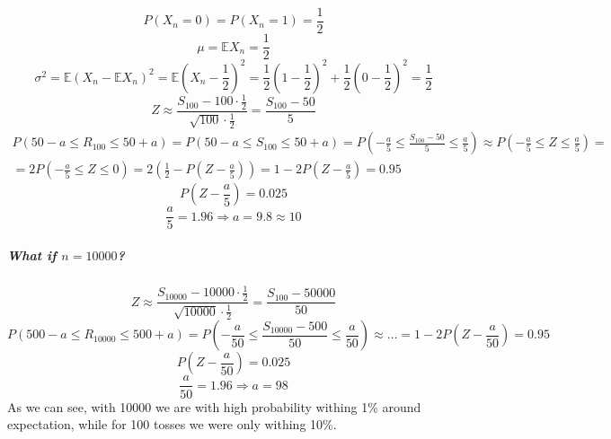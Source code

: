 $$P(X_n=0) = P(X_n=1) = \frac{1}{2}$$
$$\mu = \mathbb{E} X_n = \frac{1}{2}$$
$$\sigma^2 = \mathbb{E} \left( X_n - \mathbb{E} X_n \right)^2 = \mathbb{E} \left(X_n-\frac{1}{2}\right)^2 = \frac{1}{2}\left(1-\frac{1}{2} \right)^2  + \frac{1}{2}\left(0-\frac{1}{2} \right)^2 = \frac{1}{2}$$
$$Z \approx \frac{S_{100} - 100 \cdot \frac{1}{2}}{\sqrt{100} \cdot \frac{1}{2}} = \frac{S_{100} - 50}{5}$$
\begin{align*}
P(50-a\leq R_{100} \leq 50+a) = P(50-a\leq S_{100} \leq 50+a) = P\left(-\frac{a}{5}\leq \frac{S_{100}-50}{5} \leq \frac{a}{5}\right) \approx P\left(-\frac{a}{5}\leq Z \leq \frac{a}{5}\right) =\\= 2 P \left(-\frac{a}{5}\leq Z \leq 0\right) = 2 \left(\frac{1}{2} - P \left(Z -\frac{a}{5}\right)\right) = 1 - 2 P \left(Z -\frac{a}{5}\right) = 0.95
\end{align*}
$$P \left(Z -\frac{a}{5}\right) = 0.025$$
$$\frac{a}{5} = 1.96 \Rightarrow a = 9.8 \approx 10$$
\subparagraph{What if $n=10000$?}

$$Z \approx \frac{S_{10000} - 10000 \cdot \frac{1}{2}}{\sqrt{10000} \cdot \frac{1}{2}} = \frac{S_{100} - 50000}{50}$$
$$P(500-a\leq R_{10000} \leq 500+a) = P\left(-\frac{a}{50}\leq \frac{S_{10000}-500}{50} \leq \frac{a}{50} \right) \approx \dots = 1 - 2 P \left(Z -\frac{a}{50}\right) = 0.95$$
$$P \left(Z -\frac{a}{50}\right) = 0.025$$
$$\frac{a}{50} = 1.96 \Rightarrow a = 98 $$
As we can see, with 10000 we are with high probability withing 1\% around expectation, while for 100 tosses we were only withing 10\%.
